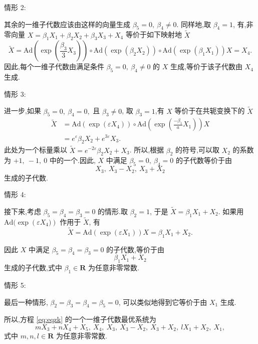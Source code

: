 情形 2:

其余的一维子代数应该由这样的向量生成 $\beta_5=0, ~\beta_4\neq 0$. 同样地,取 $\beta_4=1$, 有,非零向量 $X=\beta_{1}X_{1}+\beta_{2}X_{2}+\beta_{3}X_{3}+X_{4}$ 等价于如下映射地 $\widetilde{X}$
\begin{equation*}
	\widetilde{X}= \mbox{Ad}(\exp{(\frac{\beta_3}{3} X_3)})\circ \mbox{Ad}(\exp{(\beta_2 X_2)})\circ \mbox{Ad}(\exp{(\beta_1 X_1)}) X=X_{4}.
\end{equation*}
因此,每个一维子代数由满足条件 $\beta_5=0,~ \beta_4\neq 0$ 的 $X$ 生成,等价于该子代数由 $X_{4}$ 生成.

情形 3:

进一步,如果 $\beta_5=0,~\beta_4=0,$ 且 $\beta_3\neq 0$, 取 $\beta_3=1$,有 $X$ 等价于在共轭变换下的 $\widetilde{X}$
\begin{equation*}
\begin{aligned}
\widetilde{X}&=\mbox{Ad}(\exp(\varepsilon X_{4}))\circ \mbox{Ad}(\exp{(\frac{-\beta_1}{a} X_1)}) X\\
&=e^{\varepsilon}\beta_{2}X_{2}+e^{3\varepsilon}X_{3}.
\end{aligned}
\end{equation*}
此处为一个标量乘以 $\widetilde{X}=e^{-2\varepsilon}\beta_{2}X_{2}+X_{3}$. 所以,根据 $\beta_{2}$ 的符号,可以取 $X_{2}$ 的系数为 $+1,~-1,~0$ 中的一个.因此, $X$ 中满足 $\beta_5=0,~\beta_4=0$ 的子代数等价于由
\begin{equation*}
	X_{3}, ~X_{3}-X_{2}, ~X_{3}+X_{2}
\end{equation*}
生成的子代数.

情形 4:

接下来,考虑 $\beta_5=\beta_4=\beta_3=0$ 的情形.取 $\beta_2=1$, 于是 $\widetilde{X}=\beta_{1}X_{1}+X_{2}$. 如果用 $\mbox{Ad}(\exp({\varepsilon X_4)})$ 作用于 $\widetilde{X}$, 有
\begin{equation*}
	\widetilde{X}=\mbox{Ad}(\exp{(\varepsilon X_1)}) X=\beta_{1}X_{1}+X_{2}.
\end{equation*}

因此 $X$ 中满足 $\beta_5=\beta_4=\beta_3=0$ 的子代数,等价于由
\begin{equation*}
	\beta_{1}X_{1}+X_{2}
\end{equation*}
生成的子代数,式中 $\beta_{1} \in \mathbf{R}$ 为任意非零常数.

情形 5:

最后一种情形, $\beta_{2}=\beta_{3}=\beta_{4}=\beta_{5}=0$, 可以类似地得到它等价于由 $X_1$ 生成.

所以,方程 \eqref{eq:eqzk} 的一个一维子代数最优系统为
\begin{equation*}
	mX_{3}+nX_{4}+X_{5}, ~X_{4},~ X_{3}, ~X_{3}-X_{2},~ X_{3}+X_{2},~ lX_{1}+X_{2}, ~X_{1},
\end{equation*}
式中 $m,n,l\in \mathbf{R}$ 为任意非零常数.

